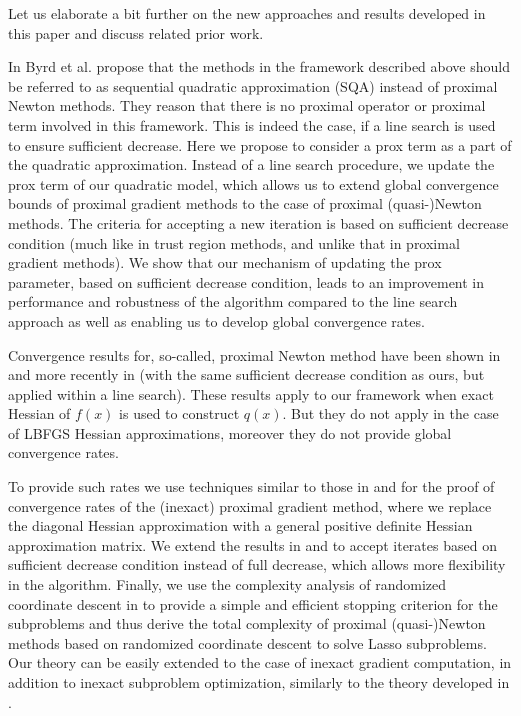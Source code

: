 \documentclass[11pt]{article}
\numberwithin{equation}{section}
\begin{document}
Let us elaborate a bit further on the new approaches and results developed in this paper and discuss related prior work. 

In \cite{Byrdetal2013} Byrd et al. propose that the methods in the framework  described above should be referred to as sequential quadratic approximation (SQA) instead of proximal Newton methods.  They reason that there is no proximal operator or proximal term involved in this framework. This is indeed the case, if a line search is used to ensure sufficient decrease. Here we propose to consider a prox term as a part of the quadratic approximation. 
Instead of a line search procedure, we update the prox term of our quadratic model, which allows us to extend global convergence bounds of proximal gradient methods to the case of proximal (quasi-)Newton methods. The criteria for accepting a new iteration is based on sufficient decrease condition (much like in trust region methods, and unlike that in proximal gradient methods).
We show that our mechanism of updating the prox parameter, based on sufficient decrease condition, leads to an improvement in performance and robustness of the algorithm compared to the line search approach as well as enabling us to develop global convergence rates. 

Convergence results for, so-called, proximal Newton method have been shown 
in \cite{Saundersetal} and more recently in \cite{Byrdetal2013} (with the same sufficient decrease condition as ours, but applied within a line search). These results apply to our framework when exact Hessian of $f(x)$ is used to construct $q(x)$. But  they do not apply in the case of LBFGS Hessian approximations, moreover they do not provide global convergence rates.  

To provide such rates  we use techniques similar to those in 
 \cite{Beck2009} and \cite{Schmidtetal} for the proof of convergence rates of the (inexact) proximal gradient method, where we replace the diagonal Hessian approximation with  a general positive definite Hessian approximation matrix.
 We extend the results in  \cite{Beck2009} and \cite{Schmidtetal}  to accept iterates based on sufficient decrease condition instead of full decrease, which allows more flexibility in the algorithm. 
 Finally, we use the complexity analysis of randomized coordinate descent in \cite{Richtarik2012} to provide a simple and efficient stopping criterion for the subproblems and thus derive the total complexity of  proximal (quasi-)Newton methods based on randomized coordinate descent to solve Lasso subproblems. 
Our theory can be easily extended to the case of inexact gradient computation, in addition to inexact subproblem optimization, similarly to  
 the theory developed in \cite{Schmidtetal}.  
 
\end{document}
